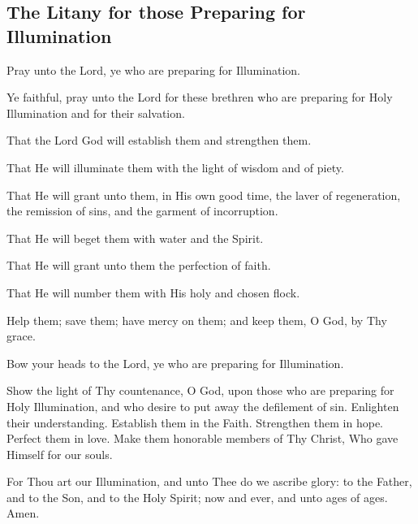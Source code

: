 \subsection{The Litany for those Preparing for Illumination}

Pray unto the Lord, ye who are preparing for Illumination.

Ye faithful, pray unto the Lord for these brethren who are preparing for Holy Illumination and for their salvation.

That the Lord God will establish them and strengthen them.

That He will illuminate them with the light of wisdom and of piety.

That He will grant unto them, in His own good time, the laver of regeneration, the remission of sins, and the garment of incorruption.

That He will beget them with water and the Spirit.

That He will grant unto them the perfection of faith. 

That He will number them with His holy and chosen flock.

Help them; save them; have mercy on them; and keep them, O God, by Thy grace.

Bow your heads to the Lord, ye who are preparing for Illumination.

Show the light of Thy countenance, O God, upon those who are preparing for Holy Illumination, and who desire to put away the defilement of sin. Enlighten their understanding. Establish them in the Faith. Strengthen them in hope. Perfect them in love. Make them honorable members of Thy Christ, Who gave Himself for our souls.

For Thou art our Illumination, and unto Thee do we ascribe glory: to the Father, and to the Son, and to the Holy Spirit; now and ever, and unto ages of ages. Amen.
